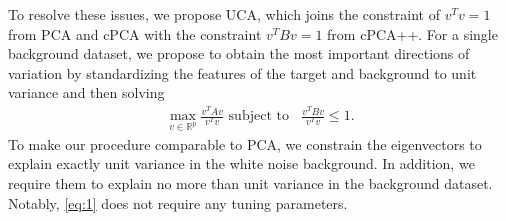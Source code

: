\documentclass[10pt]{article}
\begin{document}
To resolve these issues, we propose UCA, which joins the constraint of $v^T  v = 1$ from PCA and cPCA with the constraint $v^T Bv = 1$ from cPCA++. For a single background dataset, we propose to obtain the most important directions of variation by standardizing the features of the target and background to unit variance and then solving
\begin{equation*}
  \label{eq:1}
  \begin{aligned}
  \max_{v\in \mathbb{R}^p}{\frac{v^TAv}{v^T v}} \text{ subject to }\;\; \frac{v^TBv}{v^T v} \leq 1.
  \end{aligned}
\end{equation*}
To make our procedure comparable to PCA, we constrain the eigenvectors to explain exactly unit variance in the white noise background. In addition, we require them to explain no more than unit variance in the background dataset. Notably, \eqref{eq:1} does not require any tuning parameters.

\end{document}
